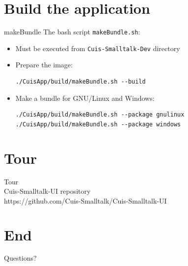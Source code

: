 \documentclass{beamer}
\begin{document}
\begin{lstlisting}[language=Smalltalk]
\end{lstlisting}

\section{Build the application}
\begin{frame}[fragile]{makeBundle}
  The bash script \texttt{makeBundle.sh}:
  \begin{itemize}
  \item Must be executed from \texttt{Cuis-Smalltalk-Dev} directory
  \item Prepare the image:
\begin{verbatim}
./CuisApp/build/makeBundle.sh --build
\end{verbatim}
  \item Make a bundle for GNU/Linux and Windows:
\begin{verbatim}
./CuisApp/build/makeBundle.sh --package gnulinux
./CuisApp/build/makeBundle.sh --package windows
\end{verbatim}
  \end{itemize}
\end{frame}  

\section{Tour}
\begin{frame}
  \begin{center}
    Tour\\
    Cuis-Smalltalk-UI repository \\
    https://github.com/Cuis-Smalltalk/Cuis-Smalltalk-UI
  \end{center}
\end{frame}

\section*{End}
\begin{frame}
  \begin{center}
    \fontsize{16pt}{8pt}\selectfont

  Questions?
\end{center}
\end{frame}
\end{document}
